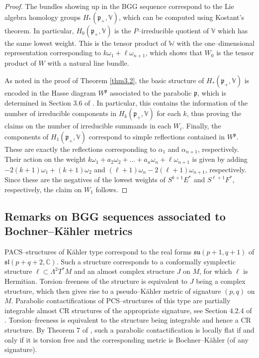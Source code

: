 \documentclass[12pt,a4paper]{amsart}
\def\frak{\mathfrak}
\def\Bbb{\mathbb}
\newcommand{\al}{\alpha}
\newcommand{\om}{\omega}
\newcommand{\La}{\Lambda}
\newcounter{theorem}
\numberwithin{theorem}{section}
\theoremstyle{definition}
\theoremstyle{remark}
\begin{document}
\begin{proof}
The bundles showing up in the BGG sequence correspond to the Lie
algebra homology groups $H_*(\frak p_+,\Bbb V)$, which can be computed
using Kostant's theorem. In particular, $H_0(\frak p_+,\Bbb V)$ is the
$P$--irreducible quotient of $\Bbb V$ which has the same lowest
weight. This is the tensor product of $\Bbb W$ with the
one--dimensional representation corresponding to
$k\om_1+\ell\om_{n+1}$, which shows that $W_0$ is the tensor product
of $W$ with a natural line bundle.

As noted in the proof of Theorem \ref{thm3.2}, the basic structure of
$H_*(\frak p_+,\Bbb V)$ is encoded in the Hasse diagram $W^{\frak p}$
associated to the parabolic $\frak p$, which is determined in Section
3.6 of \cite{subcomplexes}. In particular, this contains the
information of the number of irreducible components in $H_k(\frak
p_+,\Bbb V)$ for each $k$, thus proving the claims on the number of
irreducible summands in each $W_i$. Finally, the components of
$H_1(\frak p_+,\Bbb V)$ correspond to simple reflections contained in
$W^{\frak p}$. These are exactly the reflections corresponding to
$\al_1$ and $\al_{n+1}$, respectively. Their action on the weight
$k\om_1+a_2\om_2+\dots+a_n\om_n+\ell\om_{n+1}$ is given by adding
$-2(k+1)\om_1+(k+1)\om_2$ and $(\ell+1)\om_n-2(\ell+1)\om_{n+1}$,
respectively. Since these are the negatives of the lowest weights of
$S^{k+1}E^*$ and $S^{\ell+1}F^*$, respectively, the claim on $W_1$
follows.
\end{proof}

\subsection{Remarks on BGG sequences associated to Bochner--K\"ahler
  metrics}\label{3.4}

PACS--structures of K\"ahler type correspond to the real forms
$\frak{su}(p+1,q+1)$ of $\frak{sl}(p+q+2,\Bbb C)$. Such a structure
corresponds to a conformally symplectic structure
$\ell\subset\La^2T^*M$ and an almost complex structure $J$ on $M$, for
which $\ell$ is Hermitian. Torsion--freeness of the structure is
equivalent to $J$ being a complex structure, which then gives rise to
a pseudo--K\"ahler metric of signature $(p,q)$ on $M$. Parabolic
contactifications of PCS--structures of this type are partially
integrable almost CR structures of the appropriate signature, see
Section 4.2.4 of \cite{book}. Torsion--freeness is equivalent to the
structure being integrable and hence a CR structure. By Theorem 7
of \cite{PCS2}, such a parabolic contactification is locally flat if
and only if it is torsion free and the corresponding metric is
Bochner--K\"ahler (of any signature).
\end{document}
